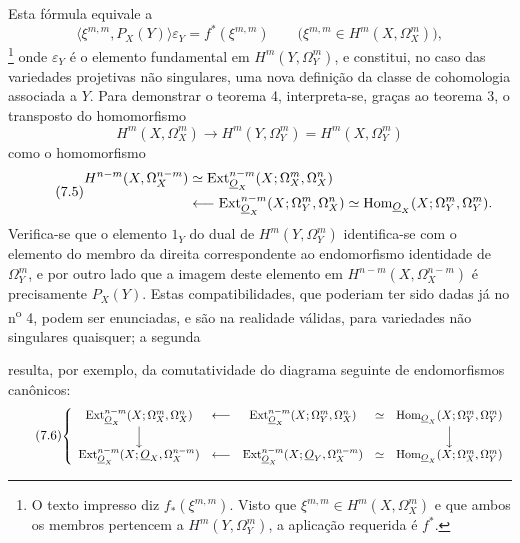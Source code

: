 Esta fórmula equivale a
\begin{equation}\tag{7.4 bis}
  \bigl\langle\xi^{m,m},P_X(Y)\bigr\rangle\varepsilon_Y
  =f^{*}(\xi^{m,m})
  \qquad
  \bigl(\xi^{m,m}\in H^{m}(X,\Omega_X^{m})\bigr),
\end{equation}
\footnote{O texto impresso diz $f_{*}(\xi^{m,m})$. Visto que
$\xi^{m,m}\in H^{m}(X,\Omega_X^{m})$ e que ambos os membros pertencem a
$H^{m}(Y,\Omega_Y^{m})$, a aplicação requerida é $f^{*}$.} onde
$\varepsilon_Y$ é o elemento fundamental em $H^{m}(Y,\Omega_Y^{m})$, e
constitui, no caso das variedades projetivas não singulares, uma nova
definição da classe de cohomologia associada a $Y$. Para demonstrar o
teorema 4, interpreta-se, graças ao teorema 3, o transposto do homomorfismo
\[
  H^{m}(X,\Omega_X^{m})
  \longrightarrow H^{m}(Y,\Omega_Y^{m})
  =H^{m}(X,\Omega_Y^{m})
\]
como o homomorfismo
\begin{equation}\tag{7.5}
\begin{split}
  H^{n-m}(X,\Omega_X^{n-m})
  &\simeq
  \operatorname{Ext}_{\underline{O}_X}^{n-m}(X;\Omega_X^{m},\Omega_X^{n})\\
  &\longleftarrow
  \operatorname{Ext}_{\underline{O}_X}^{n-m}(X;\Omega_Y^{m},\Omega_X^{n})
  \simeq
  \operatorname{Hom}_{\underline{O}_X}(X;\Omega_Y^{m},\Omega_Y^{m}).
\end{split}
\end{equation}
Verifica-se que o elemento $1_Y$ do dual de $H^{m}(Y,\Omega_Y^{m})$ identifica-se
com o elemento do membro da direita correspondente ao endomorfismo identidade de
$\Omega_Y^{m}$, e por outro lado que a imagem deste elemento em
$H^{n-m}(X,\Omega_X^{n-m})$ é precisamente $P_X(Y)$. Estas compatibilidades, que poderiam
ter sido dadas já no n\textsuperscript{o} 4, podem ser enunciadas, e são
na realidade válidas, para variedades não singulares quaisquer; a segunda

resulta, por exemplo, da comutatividade do diagrama seguinte de endomorfismos
canônicos:
\begin{equation}\tag{7.6}
\resizebox{\textwidth}{!}{$
\left\{
\begin{array}{ccccc}
\operatorname{Ext}_{\Osh_X}^{n-m}(X;\Omega_X^{m},\Omega_X^{n})
&\longleftarrow&
\operatorname{Ext}_{\Osh_X}^{n-m}(X;\Omega_Y^{m},\Omega_X^{n})
&\simeq&
\operatorname{Hom}_{\Osh_X}(X;\Omega_Y^{m},\Omega_Y^{m})\\[3pt]
\Big\downarrow&&&&\Big\downarrow\\[3pt]
\operatorname{Ext}_{\Osh_X}^{n-m}(X;\Osh_X,\Omega_X^{n-m})
&\longleftarrow&
\operatorname{Ext}_{\Osh_X}^{n-m}(X;\Osh_Y,\Omega_X^{n-m})
&\simeq&
\operatorname{Hom}_{\Osh_X}(X;\Omega_X^{m},\Omega_Y^{m})
\end{array}
\right.
$}
\end{equation}

